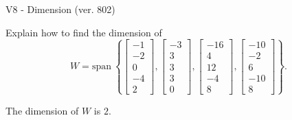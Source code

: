 \begin{exercise}
  \begin{exerciseTitle}V8 - Dimension (ver. 802)\end{exerciseTitle}
  \begin{exerciseStatement}
    Explain how to find the dimension of 
\[W=\mathrm{span}\ \left\{\left[\begin{array}{r}
-1 \\
-2 \\
0 \\
-4 \\
2
\end{array}\right] , \left[\begin{array}{r}
-3 \\
3 \\
3 \\
3 \\
0
\end{array}\right] , \left[\begin{array}{r}
-16 \\
4 \\
12 \\
-4 \\
8
\end{array}\right] , \left[\begin{array}{r}
-10 \\
-2 \\
6 \\
-10 \\
8
\end{array}\right]\right\}.\]



  \end{exerciseStatement}
  \begin{exerciseAnswer}
   The dimension of \(W\) is  \(2\).
  


  \end{exerciseAnswer}
\end{exercise}